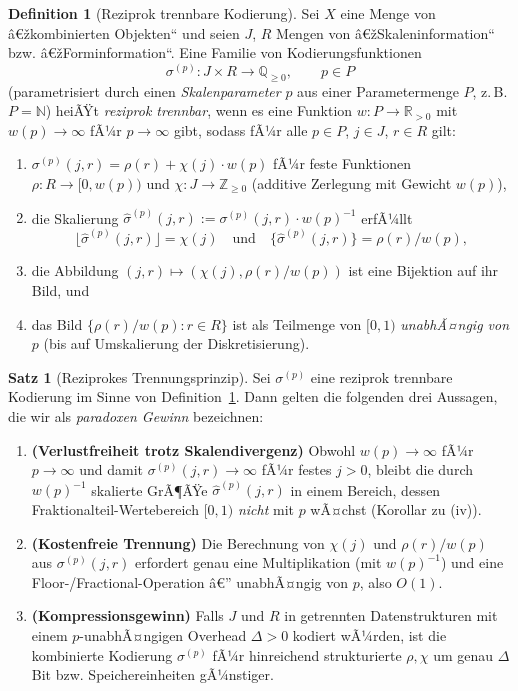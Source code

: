 ﻿\documentclass[a4paper,12pt]{article}
\theoremstyle{definition}
\newtheorem{definition}{Definition}
\newtheorem{satz}{Satz}
\begin{document}
\begin{definition}[Reziprok trennbare Kodierung]
\label{def:rtk}
	Sei $X$ eine Menge von â€žkombinierten Objekten`` und seien $J$, $R$
	Mengen von â€žSkaleninformation`` bzw. â€žForminformation``. Eine Familie
	von Kodierungsfunktionen
	\[
		\sigma^{(p)} : J \times R \longrightarrow \mathbb{Q}_{\geq 0},
		\qquad p \in P
	\]
	(parametrisiert durch einen \emph{Skalenparameter} $p$ aus einer
	Parametermenge $P$, z.\,B. $P=\mathbb{N}$) heiÃŸt
	\emph{reziprok trennbar}, wenn es eine Funktion $w:P\to\mathbb{R}_{>0}$
	mit $w(p)\to\infty$ fÃ¼r $p\to\infty$ gibt, sodass fÃ¼r alle $p\in P$,
	$j\in J$, $r\in R$ gilt:
	\begin{enumerate}[label=(\roman*)]
		\item $\sigma^{(p)}(j,r) = \rho(r) + \chi(j)\cdot w(p)$ fÃ¼r feste
		      Funktionen $\rho:R\to[0, w(p))$ und $\chi:J\to\mathbb{Z}_{\geq0}$
		      (additive Zerlegung mit Gewicht $w(p)$),
		\item die Skalierung $\hat\sigma^{(p)}(j,r) := \sigma^{(p)}(j,r)\cdot w(p)^{-1}$
		      erfÃ¼llt
		      \[
			      \lfloor \hat\sigma^{(p)}(j,r) \rfloor = \chi(j)
			      \quad\text{und}\quad
			      \{\hat\sigma^{(p)}(j,r)\} = \rho(r)/w(p),
		      \]
		\item die Abbildung $(j,r)\mapsto(\chi(j),\rho(r)/w(p))$ ist eine
		      Bijektion auf ihr Bild, und
		\item das Bild $\{\rho(r)/w(p) : r\in R\}$ ist als Teilmenge von
		      $[0,1)$ \emph{unabhÃ¤ngig von $p$} (bis auf Umskalierung der
		      Diskretisierung).
	\end{enumerate}
\end{definition}

\begin{satz}[Reziprokes Trennungsprinzip]
\label{satz:rtp}
	Sei $\sigma^{(p)}$ eine reziprok trennbare Kodierung im Sinne von
	Definition~\ref{def:rtk}. Dann gelten die folgenden drei Aussagen, die
	wir als \emph{paradoxen Gewinn} bezeichnen:
	\begin{enumerate}[label=(G\arabic*)]
		\item \textbf{(Verlustfreiheit trotz Skalendivergenz)} Obwohl
		      $w(p)\to\infty$ fÃ¼r $p\to\infty$ und damit
		      $\sigma^{(p)}(j,r)\to\infty$ fÃ¼r festes $j>0$, bleibt die durch
		      $w(p)^{-1}$ skalierte GrÃ¶ÃŸe $\hat\sigma^{(p)}(j,r)$ in einem
		      Bereich, dessen Fraktionalteil-Wertebereich $[0,1)$ \emph{nicht}
		      mit $p$ wÃ¤chst (Korollar zu (iv)).
		\item \textbf{(Kostenfreie Trennung)} Die Berechnung von $\chi(j)$ und
		      $\rho(r)/w(p)$ aus $\sigma^{(p)}(j,r)$ erfordert genau eine
		      Multiplikation (mit $w(p)^{-1}$) und eine
		      Floor-/Fractional-Operation â€” unabhÃ¤ngig von $p$, also $O(1)$.
		\item \textbf{(Kompressionsgewinn)} Falls $J$ und $R$ in getrennten
		      Datenstrukturen mit einem $p$-unabhÃ¤ngigen Overhead $\Delta>0$
		      kodiert wÃ¼rden, ist die kombinierte Kodierung $\sigma^{(p)}$ fÃ¼r
		      hinreichend strukturierte $\rho,\chi$ um genau $\Delta$ Bit
		      bzw. Speichereinheiten gÃ¼nstiger.
	\end{enumerate}
\end{satz}
\end{document}
